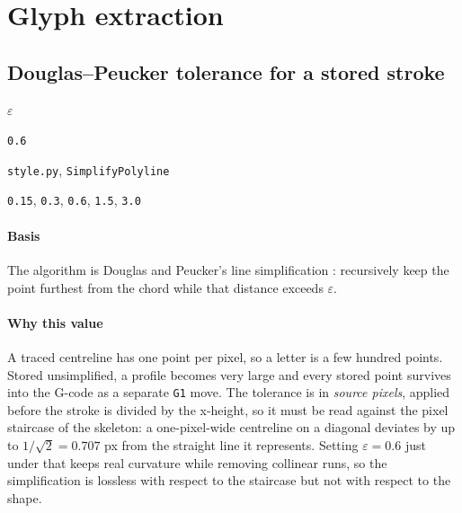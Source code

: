 \section{Glyph extraction}

\subsection{Douglas--Peucker tolerance for a stored stroke}

\label{coef:simplify-eps}

\begin{description}[leftmargin=5.2em,style=sameline]

\item[Symbol] $\varepsilon$

\item[Value] \texttt{0.6}

\item[Source] \texttt{style.py}, \texttt{SimplifyPolyline}

\item[Swept] \texttt{0.15}, \texttt{0.3}, \texttt{0.6}, \texttt{1.5}, \texttt{3.0}

\end{description}

\paragraph{Basis}

The algorithm is Douglas and Peucker's line simplification \cite{douglas1973}: recursively keep the point furthest from the chord while that distance exceeds $\varepsilon$.

\paragraph{Why this value}

A traced centreline has one point per pixel, so a letter is a few hundred points. Stored unsimplified, a profile becomes very large and every stored point survives into the G-code as a separate \texttt{G1} move. The tolerance is in \emph{source pixels}, applied before the stroke is divided by the x-height, so it must be read against the pixel staircase of the skeleton: a one-pixel-wide centreline on a diagonal deviates by up to $1/\sqrt{2} = 0.707$ px from the straight line it represents. Setting $\varepsilon = 0.6$ just under that keeps real curvature while removing collinear runs, so the simplification is lossless with respect to the staircase but not with respect to the shape.

